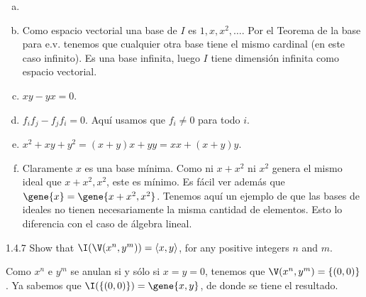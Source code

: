 \documentclass[twoside]{article}
\begin{document}
\begin{solucion}
\begin{enumerate}[a.]
\item[]
\item Como espacio vectorial una base de $I$ es $1,x,x^2,\dots$. Por el Teorema de la base para e.v. tenemos que cualquier otra base tiene el mismo cardinal (en este caso infinito).
Es una base infinita, luego $I$ tiene dimensión infinita como espacio vectorial.
\item $xy-yx = 0$.
\item $f_i f_j - f_j f_i = 0$. Aquí usamos que $f_i \neq 0$ para todo $i$.
\item $x^2+xy+y^2 = (x+y)x+yy = xx+(x+y)y$.
\item Claramente $x$ es una base mínima.
Como ni $x+x^2$ ni $x^2$ genera el mismo ideal que $x+x^2,x^2$, este es mínimo.
Es fácil ver además que $\gene{x}=\gene{x+x^2,x^2}$.
Tenemos aquí un ejemplo de que las bases de ideales no tienen necesariamente la misma cantidad de elementos.
Esto lo diferencia con el caso de álgebra lineal.
\end{enumerate}
\end{solucion}

\newpage

\begin{ejercicio}{1.4.7}
Show that $\I(\V(x^n,y^m))=\langle x,y \rangle$, for any positive integers $n$ and $m$.
\end{ejercicio}
\begin{solucion}
Como $x^n$ e $y^m$ se anulan si y sólo si $x=y=0$, tenemos que $\V(x^n,y^m)= \{(0,0)\}$. Ya sabemos que $\I(\{(0,0)\}) = \gene{x,y}$, de donde se tiene el resultado.
\end{solucion}

\newpage
\end{document}
